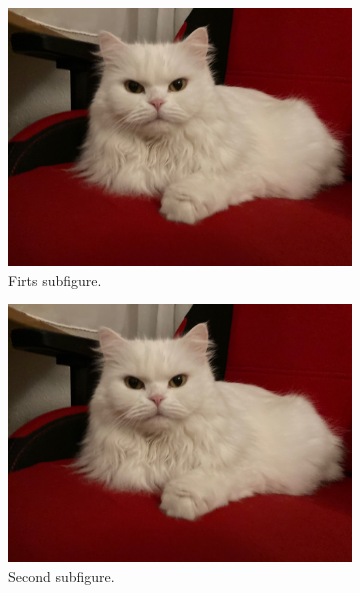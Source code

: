 \documentclass{article}
\begin{document}
        
\begin{figure}
\centering
\begin{subfigure}{0.4\textwidth}
    \includegraphics[width=\textwidth]{Bilder/Katze}
    \caption{Firts subfigure.}
    \label{fig:first}
\end{subfigure}
\hfill
\begin{subfigure}{0.4\textwidth}
    \includegraphics[width=\textwidth]{Bilder/Katze}
    \caption{Second subfigure.}
    \label{fig:second}
\end{subfigure}
\hfill
\begin{subfigure}{0.4\textwidth}

\end{subfigure}
\end{figure}
\end{document}
